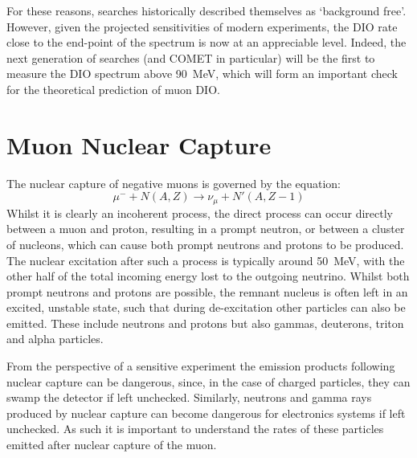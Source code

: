 For these reasons, \mueconv searches historically described themselves as `background free'.
However, given the projected sensitivities of modern experiments, the \ac{DIO} rate close to the end-point of the spectrum is now at an appreciable level.
Indeed, the next generation of searches (and COMET \phaseI in particular) will be the first to measure the \ac{DIO} spectrum above 90~MeV, which will form an important check for the theoretical prediction of muon \ac{DIO}.

\section{Muon Nuclear Capture}
The nuclear capture of negative muons is governed by the equation:
\begin{equation}
\mu^-+N(A,Z)\rightarrow \nu_\mu+N'(A,Z-1)
\end{equation}
Whilst it is clearly an incoherent process, the direct process can occur directly between a muon and proton, resulting in a prompt neutron, or between a cluster of nucleons, which can cause both prompt neutrons and protons to be produced.
The nuclear excitation after such a process is typically around 50~MeV, with the other half of the total incoming energy lost to the outgoing neutrino.
Whilst both prompt neutrons and protons are possible, the remnant nucleus is often left in an excited, unstable state, such that during de-excitation other particles can also be emitted.
These include neutrons and protons but also gammas, deuterons, triton and alpha particles.

From the perspective of a sensitive \mueconv experiment the emission products following nuclear capture can be dangerous, since, in the case of charged particles, they can swamp the detector if left unchecked.
Similarly, neutrons and gamma rays produced by nuclear capture can become dangerous for electronics systems if left unchecked.
As such it is important to understand the rates of these particles emitted after nuclear capture of the muon.

